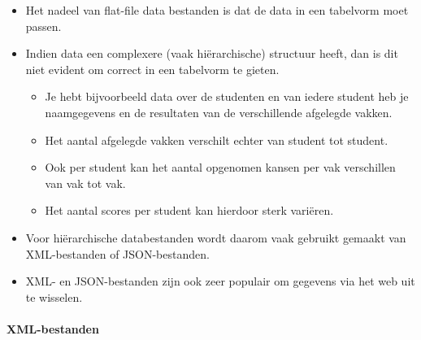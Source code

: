 \documentclass[]{tufte-book}
\providecommand{\tightlist}{%
  \setlength{\itemsep}{0pt}\setlength{\parskip}{0pt}}
\begin{document}
\begin{itemize}
\tightlist
\item
  Het nadeel van flat-file data bestanden is dat de data in een tabelvorm moet passen.
\item
  Indien data een complexere (vaak hiërarchische) structuur heeft, dan is dit niet evident om correct in een tabelvorm te gieten.

  \begin{itemize}
  \tightlist
  \item
    Je hebt bijvoorbeeld data over de studenten en van iedere student heb je naamgegevens en de resultaten van de verschillende afgelegde vakken.
  \item
    Het aantal afgelegde vakken verschilt echter van student tot student.
  \item
    Ook per student kan het aantal opgenomen kansen per vak verschillen van vak tot vak.
  \item
    Het aantal scores per student kan hierdoor sterk variëren.
  \end{itemize}
\item
  Voor hiërarchische databestanden wordt daarom vaak gebruikt gemaakt van XML-bestanden of JSON-bestanden.
\item
  XML- en JSON-bestanden zijn ook zeer populair om gegevens via het web uit te wisselen.
\end{itemize}

\hypertarget{xml-bestanden}{%
\paragraph{XML-bestanden}\label{xml-bestanden}}
\end{document}
